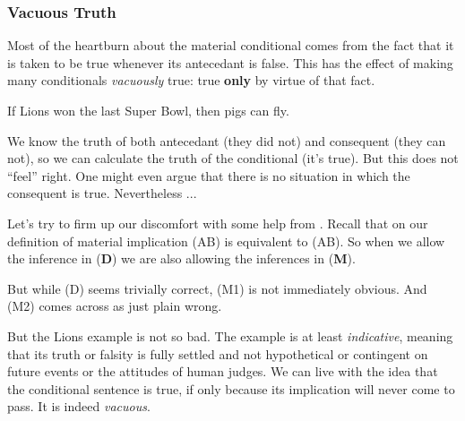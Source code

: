 \subsubsection{Vacuous Truth}

Most of the heartburn about the material conditional comes from the fact that
it is taken to be true whenever its antecedant is false. This has the effect
of making many conditionals \emph{vacuously} true: true \textbf{only} by virtue
of that fact.

\begin{argument}
  \item[ ] If Lions won the last Super Bowl, then pigs can fly.
\end{argument}

We know the truth of both antecedant (they did not) and consequent (they can
not), so we can calculate the truth of the conditional (it's true). But this
does not ``feel'' right. One might even argue that there is no situation in
which the consequent is true. Nevertheless ...

Let's try to firm up our discomfort with some help from
\cite[][pp. 166-167]{Smi20}. Recall that on our definition of material
implication (A\eif B) is equivalent to (\enot A\eor B). So when we allow the
inference in (\textbf{D}) we are also allowing the inferences in (\textbf{M}).


But while (D) seems trivially correct, (M1) is not immediately obvious. And (M2)
comes across as just plain wrong.

But the Lions example is not so bad. The example is at least \emph{indicative},
meaning that its truth or falsity is fully settled and not hypothetical or
contingent on future events or the attitudes of human judges. We can live
with the idea that the conditional sentence is true, if only because its
implication will never come to pass. It is indeed \emph{vacuous}.

